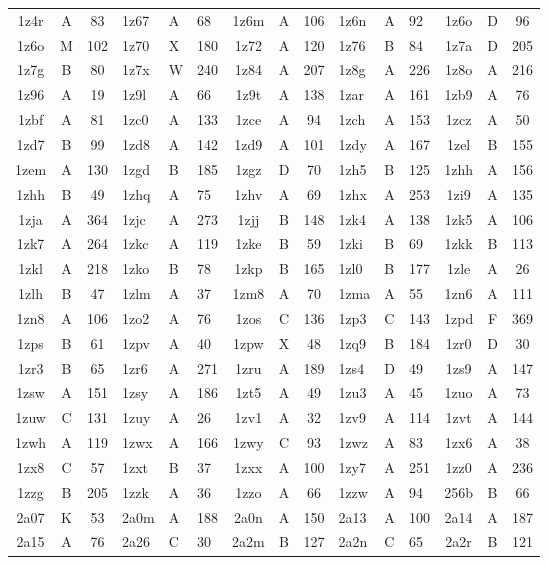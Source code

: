 \begin{longtable}{|c|c|c| a|a|a| c|c|c| a|a|a| c|c|c|}
1z4r & A & 83 & 1z67 & A & 68 & 1z6m & A & 106 & 1z6n & A & 92 & 1z6o & D & 96\\
1z6o & M & 102 & 1z70 & X & 180 & 1z72 & A & 120 & 1z76 & B & 84 & 1z7a & D & 205\\
1z7g & B & 80 & 1z7x & W & 240 & 1z84 & A & 207 & 1z8g & A & 226 & 1z8o & A & 216\\
1z96 & A & 19 & 1z9l & A & 66 & 1z9t & A & 138 & 1zar & A & 161 & 1zb9 & A & 76\\
1zbf & A & 81 & 1zc0 & A & 133 & 1zce & A & 94 & 1zch & A & 153 & 1zcz & A & 50\\
1zd7 & B & 99 & 1zd8 & A & 142 & 1zd9 & A & 101 & 1zdy & A & 167 & 1zel & B & 155\\
1zem & A & 130 & 1zgd & B & 185 & 1zgz & D & 70 & 1zh5 & B & 125 & 1zhh & A & 156\\
1zhh & B & 49 & 1zhq & A & 75 & 1zhv & A & 69 & 1zhx & A & 253 & 1zi9 & A & 135\\
1zja & A & 364 & 1zjc & A & 273 & 1zjj & B & 148 & 1zk4 & A & 138 & 1zk5 & A & 106\\
1zk7 & A & 264 & 1zkc & A & 119 & 1zke & B & 59 & 1zki & B & 69 & 1zkk & B & 113\\
1zkl & A & 218 & 1zko & B & 78 & 1zkp & B & 165 & 1zl0 & B & 177 & 1zle & A & 26\\
1zlh & B & 47 & 1zlm & A & 37 & 1zm8 & A & 70 & 1zma & A & 55 & 1zn6 & A & 111\\
1zn8 & A & 106 & 1zo2 & A & 76 & 1zos & C & 136 & 1zp3 & C & 143 & 1zpd & F & 369\\
1zps & B & 61 & 1zpv & A & 40 & 1zpw & X & 48 & 1zq9 & B & 184 & 1zr0 & D & 30\\
1zr3 & B & 65 & 1zr6 & A & 271 & 1zru & A & 189 & 1zs4 & D & 49 & 1zs9 & A & 147\\
1zsw & A & 151 & 1zsy & A & 186 & 1zt5 & A & 49 & 1zu3 & A & 45 & 1zuo & A & 73\\
1zuw & C & 131 & 1zuy & A & 26 & 1zv1 & A & 32 & 1zv9 & A & 114 & 1zvt & A & 144\\
1zwh & A & 119 & 1zwx & A & 166 & 1zwy & C & 93 & 1zwz & A & 83 & 1zx6 & A & 38\\
1zx8 & C & 57 & 1zxt & B & 37 & 1zxx & A & 100 & 1zy7 & A & 251 & 1zz0 & A & 236\\
1zzg & B & 205 & 1zzk & A & 36 & 1zzo & A & 66 & 1zzw & A & 94 & 256b & B & 66\\
2a07 & K & 53 & 2a0m & A & 188 & 2a0n & A & 150 & 2a13 & A & 100 & 2a14 & A & 187\\
2a15 & A & 76 & 2a26 & C & 30 & 2a2m & B & 127 & 2a2n & C & 65 & 2a2r & B & 121\\

\end{longtable}
